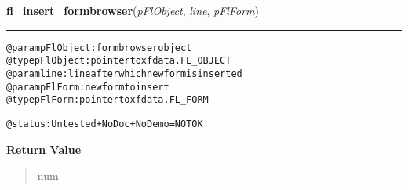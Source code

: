     \label{xformslib:flformbrowser:fl_insert_formbrowser}

    \vspace{0.5ex}

\hspace{.8\funcindent}\begin{boxedminipage}{\funcwidth}

    \raggedright \textbf{fl\_insert\_formbrowser}(\textit{pFlObject}, \textit{line}, \textit{pFlForm})

    \vspace{-1.5ex}

    \rule{\textwidth}{0.5\fboxrule}
\setlength{\parskip}{2ex}
\begin{alltt}
@param pFlObject: formbrowser object
@type pFlObject: pointer to xfdata.FL\_OBJECT
@param line: line after which new form is inserted
@param pFlForm: new form to insert
              @type pFlForm: pointer to xfdata.FL\_FORM

@status: Untested + NoDoc + NoDemo = NOT OK
\end{alltt}

\setlength{\parskip}{1ex}
      \textbf{Return Value}
    \vspace{-1ex}

      \begin{quote}
      num

      \end{quote}

    \end{boxedminipage}

    \label{xformslib:flformbrowser:fl_get_formbrowser_area}

    \vspace{0.5ex}

